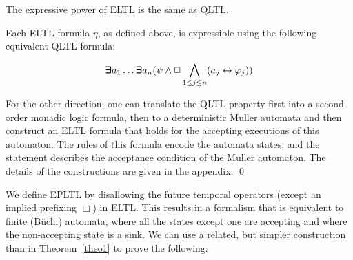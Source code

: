 \begin{theorem}
\label{theo1}
The expressive power of 
ELTL is the same as QLTL.
\end{theorem}
Each ELTL formula $\eta$, as defined above,
is expressible using the following equivalent QLTL formula:

\[   \bm{\exists}\kern-0.6em\bm{\exists} a_1 \ldots \bm{\exists}\kern-0.6em\bm{\exists} a_n  ( \psi  \wedge   \Box \bigwedge_{1 \leq j \leq n} ( a_j \leftrightarrow \varphi_j))
\]


\noindent
For the other direction, one can translate the QLTL property first into
a second-order monadic logic formula, then to a deterministic Muller automata and then construct an ELTL formula that holds for the accepting executions of this automaton. The rules of this formula encode the automata states, and the statement describes the acceptance condition of the Muller automaton.
The details of the
constructions are given in the appendix. \qed

We define EPLTL by disallowing the future temporal operators (except an implied prefixing $\Box$) in ELTL. This results in
a formalism that is equivalent to finite (B\"{u}chi) automata, where all the states except one are accepting and where the non-accepting state is a sink. 
We can use a related, but simpler construction than in Theorem~\ref{theo1} to prove the following:


